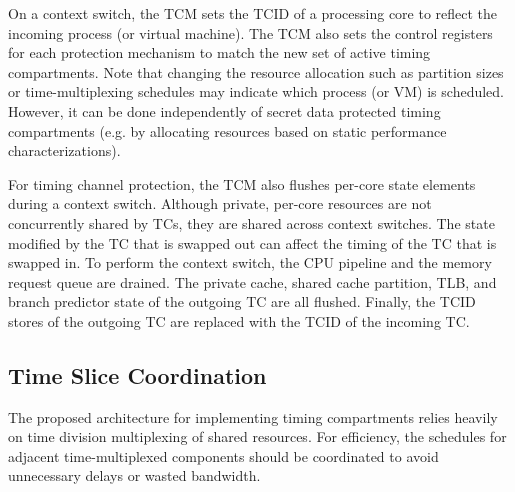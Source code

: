 On a context switch, the TCM sets the TCID of a processing core to reflect
the incoming process (or virtual machine). The TCM also sets the control
registers for each protection mechanism to match the new set of active
timing compartments. Note that changing the resource allocation such as
partition sizes or time-multiplexing schedules may indicate
which process (or VM) is scheduled. However, it can be done independently
of secret data protected timing compartments (e.g. by allocating resources 
based on static performance characterizations).

For timing channel protection, the TCM also flushes per-core state elements
during a context switch.
Although private, per-core resources are not concurrently shared by TCs, they 
are shared across context switches. The state modified by the TC that is 
swapped out can affect the timing of the TC that is swapped in.
To perform the context switch, the CPU pipeline and the memory request queue 
are drained. 
The private cache, shared cache 
partition, TLB, and branch predictor state of the outgoing TC are all flushed.  
Finally, the TCID stores of the outgoing TC are replaced with the TCID of the 
incoming TC. 


\subsection{Time Slice Coordination}
\label{sec:coordination}

The proposed architecture for implementing timing compartments relies heavily on
time division multiplexing of shared resources. For efficiency, the schedules
for adjacent time-multiplexed components should be coordinated to avoid 
unnecessary delays or wasted bandwidth.

